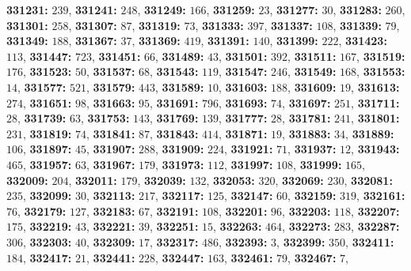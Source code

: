 \textsf{\bfseries 331231:} $239$, \textsf{\bfseries 331241:} $248$, \textsf{\bfseries 331249:} $166$, \textsf{\bfseries 331259:} $23$, \textsf{\bfseries 331277:} $30$, \textsf{\bfseries 331283:} $260$, \textsf{\bfseries 331301:} $258$, \textsf{\bfseries 331307:} $87$, \textsf{\bfseries 331319:} $73$, \textsf{\bfseries 331333:} $397$, \textsf{\bfseries 331337:} $108$, \textsf{\bfseries 331339:} $79$, \textsf{\bfseries 331349:} $188$, \textsf{\bfseries 331367:} $37$, \textsf{\bfseries 331369:} $419$, \textsf{\bfseries 331391:} $140$, \textsf{\bfseries 331399:} $222$, \textsf{\bfseries 331423:} $113$, \textsf{\bfseries 331447:} $723$, \textsf{\bfseries 331451:} $66$, \textsf{\bfseries 331489:} $43$, \textsf{\bfseries 331501:} $392$, \textsf{\bfseries 331511:} $167$, \textsf{\bfseries 331519:} $176$, \textsf{\bfseries 331523:} $50$, \textsf{\bfseries 331537:} $68$, \textsf{\bfseries 331543:} $119$, \textsf{\bfseries 331547:} $246$, \textsf{\bfseries 331549:} $168$, \textsf{\bfseries 331553:} $14$, \textsf{\bfseries 331577:} $521$, \textsf{\bfseries 331579:} $443$, \textsf{\bfseries 331589:} $10$, \textsf{\bfseries 331603:} $188$, \textsf{\bfseries 331609:} $19$, \textsf{\bfseries 331613:} $274$, \textsf{\bfseries 331651:} $98$, \textsf{\bfseries 331663:} $95$, \textsf{\bfseries 331691:} $796$, \textsf{\bfseries 331693:} $74$, \textsf{\bfseries 331697:} $251$, \textsf{\bfseries 331711:} $28$, \textsf{\bfseries 331739:} $63$, \textsf{\bfseries 331753:} $143$, \textsf{\bfseries 331769:} $139$, \textsf{\bfseries 331777:} $28$, \textsf{\bfseries 331781:} $241$, \textsf{\bfseries 331801:} $231$, \textsf{\bfseries 331819:} $74$, \textsf{\bfseries 331841:} $87$, \textsf{\bfseries 331843:} $414$, \textsf{\bfseries 331871:} $19$, \textsf{\bfseries 331883:} $34$, \textsf{\bfseries 331889:} $106$, \textsf{\bfseries 331897:} $45$, \textsf{\bfseries 331907:} $288$, \textsf{\bfseries 331909:} $224$, \textsf{\bfseries 331921:} $71$, \textsf{\bfseries 331937:} $12$, \textsf{\bfseries 331943:} $465$, \textsf{\bfseries 331957:} $63$, \textsf{\bfseries 331967:} $179$, \textsf{\bfseries 331973:} $112$, \textsf{\bfseries 331997:} $108$, \textsf{\bfseries 331999:} $165$, \textsf{\bfseries 332009:} $204$, \textsf{\bfseries 332011:} $179$, \textsf{\bfseries 332039:} $132$, \textsf{\bfseries 332053:} $320$, \textsf{\bfseries 332069:} $230$, \textsf{\bfseries 332081:} $235$, \textsf{\bfseries 332099:} $30$, \textsf{\bfseries 332113:} $217$, \textsf{\bfseries 332117:} $125$, \textsf{\bfseries 332147:} $60$, \textsf{\bfseries 332159:} $319$, \textsf{\bfseries 332161:} $76$, \textsf{\bfseries 332179:} $127$, \textsf{\bfseries 332183:} $67$, \textsf{\bfseries 332191:} $108$, \textsf{\bfseries 332201:} $96$, \textsf{\bfseries 332203:} $118$, \textsf{\bfseries 332207:} $175$, \textsf{\bfseries 332219:} $43$, \textsf{\bfseries 332221:} $39$, \textsf{\bfseries 332251:} $15$, \textsf{\bfseries 332263:} $464$, \textsf{\bfseries 332273:} $283$, \textsf{\bfseries 332287:} $306$, \textsf{\bfseries 332303:} $40$, \textsf{\bfseries 332309:} $17$, \textsf{\bfseries 332317:} $486$, \textsf{\bfseries 332393:} $3$, \textsf{\bfseries 332399:} $350$, \textsf{\bfseries 332411:} $184$, \textsf{\bfseries 332417:} $21$, \textsf{\bfseries 332441:} $228$, \textsf{\bfseries 332447:} $163$, \textsf{\bfseries 332461:} $79$, \textsf{\bfseries 332467:} $7$, 
